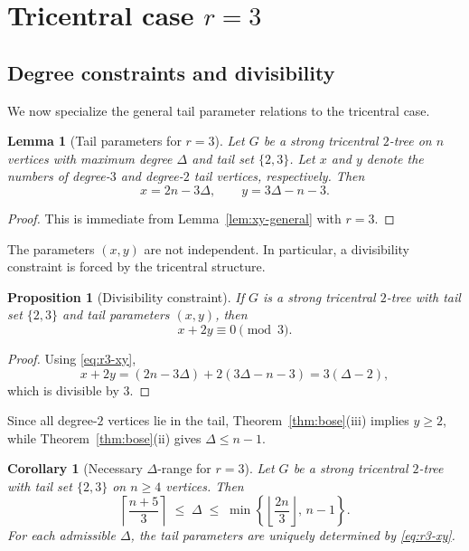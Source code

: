 \documentclass[12pt]{article}
\newtheorem{lemma}[theorem]{Lemma}
\newtheorem{corollary}[theorem]{Corollary}
\newtheorem{proposition}[theorem]{Proposition}
\numberwithin{equation}{section}
\begin{document}
\section{Tricentral case \texorpdfstring{$r=3$}{r=3}}

\subsection{Degree constraints and divisibility}

We now specialize the general tail parameter relations to the tricentral case.

\begin{lemma}[Tail parameters for $r=3$]
\label{lem:r3-xy}
Let $G$ be a strong tricentral $2$-tree on $n$ vertices with maximum degree $\Delta$
and tail set $\{2,3\}$. Let $x$ and $y$ denote the numbers of degree-$3$ and
degree-$2$ tail vertices, respectively. Then
\begin{equation}\label{eq:r3-xy}
x = 2n - 3\Delta, 
\qquad
y = 3\Delta - n - 3.
\end{equation}
\end{lemma}

\begin{proof}
This is immediate from Lemma~\ref{lem:xy-general} with $r=3$.
\end{proof}

The parameters $(x,y)$ are not independent. In particular, a divisibility
constraint is forced by the tricentral structure.

\begin{proposition}[Divisibility constraint]
\label{prop:r3-divisibility}
If $G$ is a strong tricentral $2$-tree with tail set $\{2,3\}$ and tail parameters
$(x,y)$, then
\[
x + 2y \equiv 0 \pmod{3}.
\]
\end{proposition}

\begin{proof}
Using \eqref{eq:r3-xy},
\[
x + 2y = (2n - 3\Delta) + 2(3\Delta - n - 3)
      = 3(\Delta - 2),
\]
which is divisible by $3$.
\end{proof}

Since all degree-$2$ vertices lie in the tail, Theorem~\ref{thm:bose}(iii) implies
$y \ge 2$, while Theorem~\ref{thm:bose}(ii) gives $\Delta \le n-1$.

\begin{corollary}[Necessary $\Delta$-range for $r=3$]
\label{cor:r3-delta-range}
Let $G$ be a strong tricentral $2$-tree with tail set $\{2,3\}$ on $n\ge 4$ vertices.
Then
\[
\left\lceil \frac{n+5}{3} \right\rceil
\;\le\;
\Delta
\;\le\;
\min\!\left\{ \left\lfloor \frac{2n}{3} \right\rfloor,\, n-1 \right\}.
\]
For each admissible $\Delta$, the tail parameters are uniquely determined by
\eqref{eq:r3-xy}.
\end{corollary}
\end{document}

